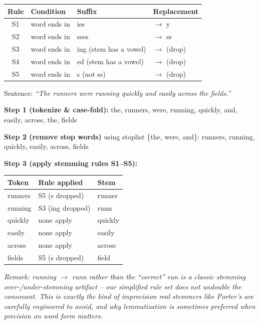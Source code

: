 \documentclass[11pt, a4paper]{article}
\newcommand{\Note}[1]{\par\noindent\textit{\color{darkgray}Remark: #1}\par}
\begin{document}
\begin{center}
\begin{tabular}{@{}clll@{}}
\toprule
Rule & Condition & Suffix & Replacement \\
\midrule
S1 & word ends in & \textsf{ies} & $\to$ \textsf{y} \\
S2 & word ends in & \textsf{sses} & $\to$ \textsf{ss} \\
S3 & word ends in & \textsf{ing} (stem has a vowel) & $\to$ (drop) \\
S4 & word ends in & \textsf{ed} (stem has a vowel) & $\to$ (drop) \\
S5 & word ends in & \textsf{s} (not \textsf{ss}) & $\to$ (drop) \\
\bottomrule
\end{tabular}
\end{center}

\begin{examplebox}
Sentence: \textit{``The runners were running quickly and easily across the fields.''}

\textbf{Step 1 (tokenize \& case-fold):} the, runners, were, running, quickly, and, easily, across, the, fields

\textbf{Step 2 (remove stop words)} using stoplist \{the, were, and\}: runners, running, quickly, easily, across, fields

\textbf{Step 3 (apply stemming rules S1--S5):}
\begin{center}
\begin{tabular}{@{}lll@{}}
\toprule
Token & Rule applied & Stem \\
\midrule
runners & S5 (\textsf{s} dropped) & runner \\
running & S3 (\textsf{ing} dropped) & runn \\
quickly & none apply & quickly \\
easily & none apply & easily \\
across & none apply & across \\
fields & S5 (\textsf{s} dropped) & field \\
\bottomrule
\end{tabular}
\end{center}
\Note{\textsf{running} $\to$ \textsf{runn} rather than the ``correct'' \textsf{run} is a classic stemming over-/under-stemming artifact -- our simplified rule set does not undouble the consonant. This is exactly the kind of imprecision real stemmers like Porter's are carefully engineered to avoid, and why lemmatization is sometimes preferred when precision on word form matters.}
\end{examplebox}
\end{document}
